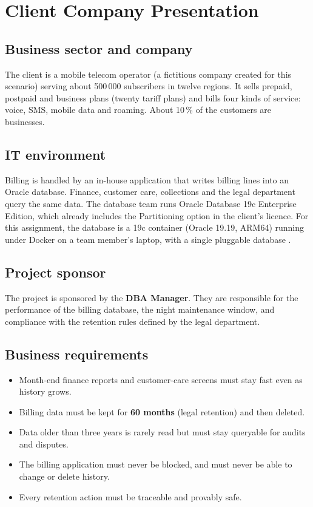 \chapter{Client Company Presentation}\label{ch:client}

\section{Business sector and company}

The client is a mobile telecom operator (a fictitious company created for this scenario)
serving about 500\,000 subscribers in twelve regions. It sells prepaid, postpaid and business
plans (twenty tariff plans) and bills four kinds of service: voice, SMS, mobile data and
roaming. About 10\,\% of the customers are businesses.

\section{IT environment}

Billing is handled by an in-house application that writes billing lines into an Oracle
database. Finance, customer care, collections and the legal department query the same data.
The database team runs Oracle Database 19c Enterprise Edition, which already includes the
Partitioning option in the client's licence. For this assignment, the database is a 19c
container (Oracle 19.19, ARM64) running under Docker on a team member's laptop, with a single
pluggable database .

\section{Project sponsor}

The project is sponsored by the \textbf{DBA Manager}. They are responsible for the
performance of the billing database, the night maintenance window, and compliance with the
retention rules defined by the legal department.

\section{Business requirements}

\begin{itemize}
  \item Month-end finance reports and customer-care screens must stay fast even as history
        grows.
  \item Billing data must be kept for \textbf{60 months} (legal retention) and then deleted.
  \item Data older than three years is rarely read but must stay queryable for audits and
        disputes.
  \item The billing application must never be blocked, and must never be able to change or
        delete history.
  \item Every retention action must be traceable and provably safe.
\end{itemize}

